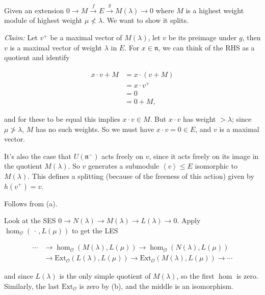 \documentclass[11pt]{scrartcl}
\theoremstyle{definition}
\theoremstyle{theorem}
\theoremstyle{proof}
\newenvironment{proof}
{\pushQED{$\qed$}\pf}
{\par\popQED\endpf}
\theoremstyle{definition}
\theoremstyle{break}
\theoremstyle{problem}
\newcommand{\ext}[0]{\text{Ext}}
\newcommand{\generators}[1]{\left\langle{#1}\right\rangle}
\newcommand{\lien}[0]{{\mathfrak{n}}}
\newcommand{\mapsvia}[1]{\xrightarrow{#1}}
\newcommand{\OO}[0]{{\mathcal{O}}}
\newcommand{\wait}[0]{{\,\cdot\,}}
\renewcommand{\qed}[0]{\hfill\blacksquare}
\renewcommand{\to}[0]{\longrightarrow}
\begin{document}
\begin{proof}[of (a)]

Given an extension
\(0 \to M \mapsvia{f} E \mapsvia{g} M(\lambda) \to 0\) where \(M\) is a
highest weight module of highest weight \(\mu \not< \lambda\). We want
to show it splits.

\emph{Claim:} Let \(v^+\) be a maximal vector of \(M(\lambda)\), let
\(v\) be its preimage under \(g\), then \(v\) is a maximal vector of
weight \(\lambda\) in \(E\). For \(x\in \lien\), we can think of the RHS
as a quotient and identify

\begin{align*}
x\cdot v + M
&= x\cdot (v+M) \\
&= x\cdot v^+ \\
&= 0 \\
&= 0 + M
,\end{align*}

and for these to be equal this implies \(x\cdot v \in M\). But
\(x\cdot v\) has weight \(> \lambda\); since \(\mu \not> \lambda\),
\(M\) has no such weights. So we must have \(x\cdot v = 0\in E\), and
\(v\) is a maximal vector.

It's also the case that \(U(\lien^-)\) acts freely on \(v\), since it
acts freely on its image in the quotient \(M(\lambda)\). So \(v\)
generates a submodule \(\generators{v} \leq E\) isomorphic to
\(M(\lambda)\). This defines a splitting (because of the freeness of
this action) given by \(h(v^+) = v\).\end{proof}

\begin{proof}[of (b)]

Follows from (a).\end{proof}

\begin{proof}[of (c)]

Look at the SES \(0\to N(\lambda) \to M(\lambda) \to L(\lambda) \to 0\).
Apply \(\hom_\OO(\wait, L(\mu))\) to get the LES

\begin{align*}
\cdots &\to \hom_\OO(M(\lambda), L(\mu)) \to \hom_\OO( N(\lambda), L(\mu)  ) \\
&\to \ext_\OO( L(\lambda), L(\mu)  ) \to \ext_\OO( M(\lambda), L(\mu)  ) \to \cdots
\end{align*}

and since \(L(\lambda)\) is the only simple quotient of \(M(\lambda)\),
so the first \(\hom\) is zero. Similarly, the last \(\ext_\OO\) is zero
by (b), and the middle is an isomorphism.\end{proof}
\end{document}

